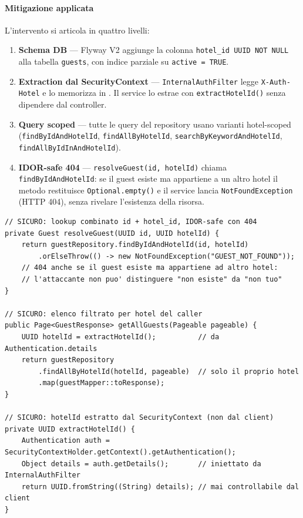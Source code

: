 ﻿\documentclass[a4paper,12pt]{report}
\begin{document}
\paragraph{Mitigazione applicata}
L'intervento si articola in quattro livelli:

\begin{enumerate}
    \item \textbf{Schema DB} --- Flyway V2 aggiunge la colonna \texttt{hotel\_id UUID NOT NULL}
          alla tabella \texttt{guests}, con indice parziale su \texttt{active = TRUE}.
    \item \textbf{Extraction dal SecurityContext} --- \texttt{InternalAuthFilter} legge
          \texttt{X-Auth-Hotel} e lo memorizza in . Il service
          lo estrae con \texttt{extractHotelId()} senza dipendere dal controller.
    \item \textbf{Query scoped} --- tutte le query del repository usano varianti
          hotel-scoped (\texttt{findByIdAndHotelId}, \texttt{findAllByHotelId},
          \texttt{searchByKeywordAndHotelId}, \texttt{findAllByIdInAndHotelId}).
    \item \textbf{IDOR-safe 404} --- \texttt{resolveGuest(id, hotelId)} chiama
          \texttt{findByIdAndHotelId}: se il guest esiste ma appartiene a un altro hotel
          il metodo restituisce \texttt{Optional.empty()} e il service lancia
          \texttt{NotFoundException} (HTTP 404), senza rivelare l'esistenza della risorsa.
\end{enumerate}

\begin{securebox}[title={Codice Sicuro --- GuestServiceImpl.java (fix)}]
\begin{lstlisting}[style=java]
// SICURO: lookup combinato id + hotel_id, IDOR-safe con 404
private Guest resolveGuest(UUID id, UUID hotelId) {
    return guestRepository.findByIdAndHotelId(id, hotelId)
        .orElseThrow(() -> new NotFoundException("GUEST_NOT_FOUND"));
    // 404 anche se il guest esiste ma appartiene ad altro hotel:
    // l'attaccante non puo' distinguere "non esiste" da "non tuo"
}

// SICURO: elenco filtrato per hotel del caller
public Page<GuestResponse> getAllGuests(Pageable pageable) {
    UUID hotelId = extractHotelId();          // da Authentication.details
    return guestRepository
        .findAllByHotelId(hotelId, pageable)  // solo il proprio hotel
        .map(guestMapper::toResponse);
}

// SICURO: hotelId estratto dal SecurityContext (non dal client)
private UUID extractHotelId() {
    Authentication auth = SecurityContextHolder.getContext().getAuthentication();
    Object details = auth.getDetails();       // iniettato da InternalAuthFilter
    return UUID.fromString((String) details); // mai controllabile dal client
}
\end{lstlisting}
\end{securebox}
\end{document}
